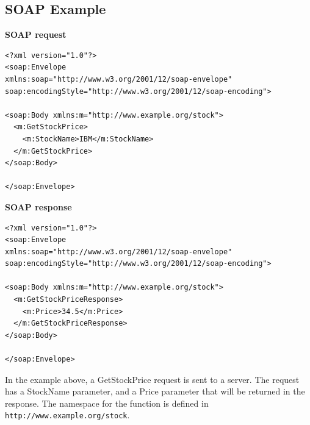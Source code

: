 \documentclass[12pt]{article}
\begin{document}
\subsection{SOAP Example}
\label{sec:soapeexample}
\textbf{SOAP request}\\
\begin{lstlisting}
<?xml version="1.0"?>
<soap:Envelope
xmlns:soap="http://www.w3.org/2001/12/soap-envelope"
soap:encodingStyle="http://www.w3.org/2001/12/soap-encoding">

<soap:Body xmlns:m="http://www.example.org/stock">
  <m:GetStockPrice>
    <m:StockName>IBM</m:StockName>
  </m:GetStockPrice>
</soap:Body>

</soap:Envelope>
\end{lstlisting}
\newpage\noindent
\textbf{SOAP response}
\begin{lstlisting}
<?xml version="1.0"?>
<soap:Envelope
xmlns:soap="http://www.w3.org/2001/12/soap-envelope"
soap:encodingStyle="http://www.w3.org/2001/12/soap-encoding">

<soap:Body xmlns:m="http://www.example.org/stock">
  <m:GetStockPriceResponse>
    <m:Price>34.5</m:Price>
  </m:GetStockPriceResponse>
</soap:Body>

</soap:Envelope>
\end{lstlisting}
In the example above, a GetStockPrice request is sent to a server. The request has a StockName parameter, and a Price parameter that will be returned in the response. The namespace for the function is defined in \texttt{http://www.example.org/stock}.\cite{soap}\\
\end{document}

